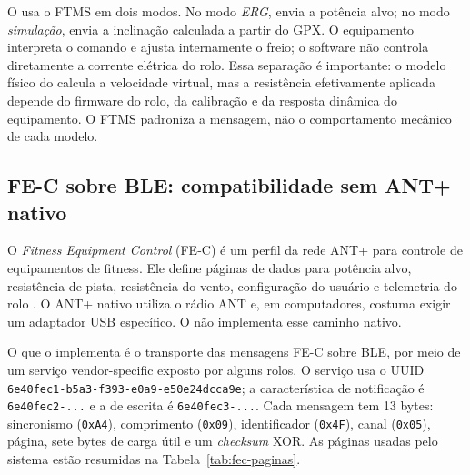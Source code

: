 O \argus{} usa o FTMS em dois modos. No modo \emph{ERG}, envia a potência alvo;
no modo \emph{simulação}, envia a inclinação calculada a partir do GPX. O
equipamento interpreta o comando e ajusta internamente o freio; o software não
controla diretamente a corrente elétrica do rolo. Essa separação é importante:
o modelo físico do \argus{} calcula a velocidade virtual, mas a resistência
efetivamente aplicada depende do firmware do rolo, da calibração e da
resposta dinâmica do equipamento. O FTMS padroniza a mensagem, não o
comportamento mecânico de cada modelo.

\subsection{FE-C sobre BLE: compatibilidade sem ANT+ nativo}
\label{sec:fec-ble}

O \textit{Fitness Equipment Control} (FE-C) é um perfil da rede ANT+ para
controle de equipamentos de fitness. Ele define páginas de dados para potência
alvo, resistência de pista, resistência do vento, configuração do usuário e
telemetria do rolo \cite{antfec2024}. O ANT+ nativo utiliza o rádio ANT e,
em computadores, costuma exigir um adaptador USB específico. O \argus{} não
implementa esse caminho nativo.

O que o \argus{} implementa é o transporte das mensagens FE-C sobre BLE, por
meio de um serviço vendor-specific exposto por alguns rolos. O serviço
usa o UUID \texttt{6e40fec1-b5a3-f393-e0a9-e50e24dcca9e}; a característica de
notificação é \texttt{6e40fec2-...} e a de escrita é \texttt{6e40fec3-...}.
Cada mensagem tem 13 bytes: sincronismo (\texttt{0xA4}), comprimento
(\texttt{0x09}), identificador (\texttt{0x4F}), canal (\texttt{0x05}), página,
sete bytes de carga útil e um \textit{checksum} XOR. As páginas usadas pelo
sistema estão resumidas na Tabela~\ref{tab:fec-paginas}.

